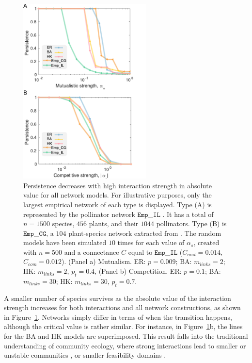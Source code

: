 \begin{figure}[t!]
    \centering
    \includegraphics[width=0.6\textwidth]{figures/chp2/fig_4.pdf}
    \caption[Impact of interaction strength on persistence]{ Persistence decreases with high  interaction strength in absolute value for all network models. For illustrative purposes, only the largest empirical network of each type is displayed. Type (A) is represented by the pollinator network
 $\texttt{Emp}$\_$\texttt{IL}$ \cite{robertson1928flowers}. It has a total  of $n = 1500$ species, $456$ plants, and their $1044$ pollinators. Type (B) is $\texttt{Emp}$\_$\texttt{CG}$, a $104$ plant-species network extracted from \cite{Saiz2017EvidenceNetworks}. The random models have been simulated $10$ times for each value of $\alpha_s$, created  with $n = 500$ and a connectance $C$ equal to $\texttt{Emp}$\_$\texttt{IL}$ ($C_{mut} = 0.014$, $C_{com} = 0.012$). (Panel a) Mutualism. ER: $p =  0.009$; BA: $m_{links} = 2$; HK: $m_{links} = 2$, $p_t = 0.4$,  (Panel b) Competition. ER: $p =  0.1$; BA: $m_{links} = 30$; HK: $m_{links} = 30$, $p_t = 0.7$.}
    \label{chp2:fig:4}
\end{figure}

A smaller number of species survives as the absolute value of the interaction strength increases for both interactions and all network constructions, as shown in Figure~\ref{chp2:fig:4}. Networks simply differ in terms of when the transition happens, although  the critical value is rather similar. For instance, in Figure~\ref{chp2:fig:4}b, the lines for the BA and HK models are superimposed. This result falls into the traditional understanding of community ecology, where strong interactions lead to smaller or unstable communities \cite{May1972WillStable}, or smaller feasibility domains \cite{Grilli2017}. \\

